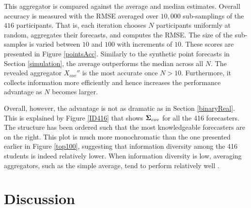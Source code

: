 \documentclass[11pt]{article}
\theoremstyle{definition}
\theoremstyle{definition}
\def\bSigma{{\bf \Sigma}}
\def\Z{{\bf Z}}
\begin{document}
This aggregator is compared against the average and median estimates. Overall accuracy is measured with the RMSE averaged over $10,000$ sub-samplings of the $416$ participants. That is, each iteration chooses $N$ participants uniformly at random, aggregates their forecasts, and computes the RMSE. The size of the sub-samples is varied between $10$ and $100$ with increments of $10$. These scores are presented in Figure \ref{pointsAcc}. Similarly to the synthetic point forecasts in Section \ref{simulation}, the average outperforms the median across all $N$. The revealed aggregator $X_{cov}''$ is the most accurate once $N > 10$. Furthermore, it collects information more efficiently and hence increases the performance advantage as $N$ becomes larger. 

Overall, however, the advantage is not as dramatic as in Section \ref{binaryReal}. This is explained by Figure \ref{ID416} that shows $\bSigma_{cov}$ for all the 416 forecasters. The structure has been ordered such that the most knowledgeable forecasters are on the right. This plot is much more monochromatic than the one presented earlier in Figure \ref{top100}, suggesting that information diversity among the 416 students is indeed relatively lower. When information diversity is low, averaging aggregators, such as the simple average, tend to perform relatively well \citep{satopaamodeling}. 








\section{Discussion}
\label{discussion}
\end{document}
